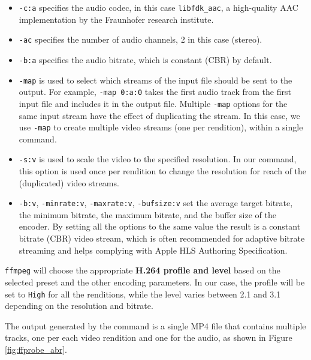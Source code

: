 \begin{itemize}
    \item \texttt{-c:a} specifies the audio codec, in this case \texttt{libfdk\_aac}, a high-quality AAC implementation by the Fraunhofer research institute.
    \item \texttt{-ac} specifies the number of audio channels, 2 in this case (stereo).
    \item \texttt{-b:a} specifies the audio bitrate, which is constant (CBR) by default.
    \item \texttt{-map} is used to select which streams of the input file should be sent to the output. For example, \texttt{-map 0:a:0} takes the first audio track from the first input file and includes it in the output file. Multiple \texttt{-map} options for the same input stream have the effect of duplicating the stream. In this case, we use \texttt{-map} to create multiple video streams (one per rendition), within a single command.
    \item \texttt{-s:v} is used to scale the video to the specified resolution. In our command, this option is used once per rendition to change the resolution for reach of the (duplicated) video streams.
    \item \texttt{-b:v}, \texttt{-minrate:v}, \texttt{-maxrate:v}, \texttt{-bufsize:v} set the average target bitrate, the minimum bitrate, the maximum bitrate, and the buffer size of the encoder. By setting all the options to the same value the result is a constant bitrate (CBR) video stream, which is often recommended for adaptive bitrate streaming and helps complying with Apple HLS Authoring Specification.\cite{ozer}\cite{hlsauthoring}
\end{itemize}

\texttt{ffmpeg} will choose the appropriate \textbf{H.264 profile and level} based on the selected preset and the other encoding parameters. In our case, the profile will be set to \texttt{High} for all the renditions, while the level varies between 2.1 and 3.1 depending on the resolution and bitrate.

The output generated by the command is a single MP4 file that contains multiple tracks, one per each video rendition and one for the audio, as shown in Figure \ref{fig:ffprobe_abr}.

